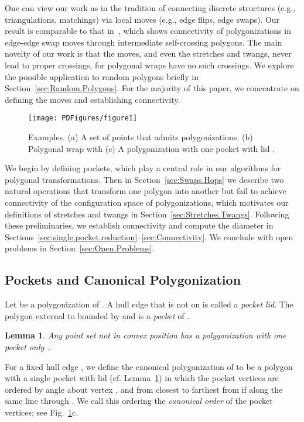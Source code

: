 \pdfoutput=1  \documentclass{article}
\newtheorem{lemma}[theorem]{Lemma}
\newcommand{\lemlab}[1]{\label{lemma:#1}}
\newcommand{\figlab}[1]{\label{fig:#1}}
\newcommand{\seclab}[1]{\label{sec:#1}}
\newcommand{\lemref}[1]{\ref{lemma:#1}}
\newcommand{\secref}[1]{\ref{sec:#1}}
\newcommand{\figref}[1]{\ref{fig:#1}}
\begin{document}
One can view our work as in the
tradition of connecting discrete structures (e.g., triangulations,
matchings) via local moves (e.g., edge flips, edge swaps).  Our result
is comparable to that in~\cite{ls-utstp-82}, which shows connectivity
of polygonizations in  edge-edge swap moves through
intermediate self-crossing polygons. The main novelty of our work is
that the moves, and even the stretches and twangs, never lead to
proper crossings, for polygonal wraps have no such crossings. We explore
the possible application to random polygons briefly in
Section~\secref{Random.Polygons}. For the majority of this paper, we
concentrate on defining the moves and establishing connectivity.

\begin{figure}[htbp]
\centering
\texttt{[image: PDFigures/figure1]}
\vspace{-0.5em}\caption{Examples. (a) A set of  points that
admits  polygonizations. (b) Polygonal wrap  with
 (c) A polygonization with
one pocket with lid .} \figlab{one.pocket.polygonization}
\end{figure}


We begin by defining pockets, which play a central role in our
algorithms for polygonal transformations. Then in
Section~\secref{Swaps.Hops} we describe two natural operations that
transform one polygon into another but fail to achieve connectivity of
the configuration space of polygonizations, which motivates our
definitions of stretches and twangs in
Section~\secref{Stretches.Twangs}. Following these preliminaries, we
establish connectivity and compute the diameter in
Sections~\secref{single.pocket.reduction}--\secref{Connectivity}.
We conclude with open problems in Section~\secref{Open.Problems}.

\subsection{Pockets and Canonical Polygonization}
\seclab{Pockets} Let  be a polygonization of . A hull edge
 that is not on  is called a \emph{pocket lid}. The
polygon external to  bounded by  and  is a \emph{pocket}
of .


\begin{lemma}
Any point set  not in convex position has a polygonization with
one pocket only~\emph{\cite{chuz-peps-92}}. \lemlab{one.pocket}
\end{lemma}
For a fixed hull edge , we define the canonical polygonization
of  to be a polygon with a single pocket with lid  (cf.
Lemma~\lemref{one.pocket}) in which the pocket vertices are ordered
by angle about vertex , and from closest to farthest from  if
along the same line through . We call this ordering the
\emph{canonical order} of the pocket vertices; see
Fig.~\figref{one.pocket.polygonization}c.
\end{document}
